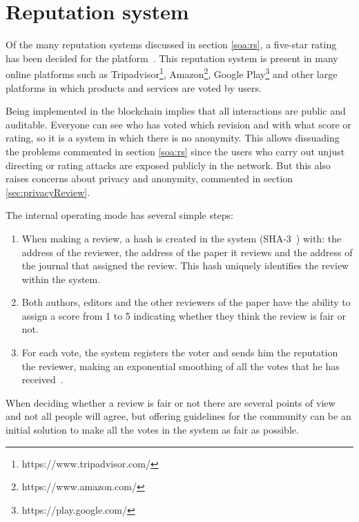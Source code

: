 \section{Reputation system}
\label{rep:system}

Of the many reputation systems discussed in section \ref{soa:rs}, a five-star
rating has been decided for the platform~\cite{kinateder2003architecture}. This
reputation system is present in many online platforms such as
Tripadvisor\footnote{https://www.tripadvisor.com/},
Amazon\footnote{https://www.amazon.com/}, Google
Play\footnote{https://play.google.com/} and other large platforms in which
products and services are voted by users.

Being implemented in the blockchain implies that all interactions are public and
auditable. Everyone can see who has voted which revision and with what score or
rating, so it is a system in which there is no anonymity. This allows dissuading
the problems commented in section \ref{soa:rs} since the users who carry out
unjust directing or rating attacks are exposed publicly in the network. But this
also raises concerns about privacy and anonymity, commented in section
\ref{sec:privacyReview}.

The internal operating mode has several simple steps:
\begin{enumerate}
\item When making a review, a hash is created in the system
  (SHA-3~\cite{aumasson2008sha}) with: the address of the reviewer, the address
  of the paper it reviews and the address of the journal that assigned the
  review. This hash uniquely identifies the review within the system.
  
\item Both authors, editors and the other reviewers of the paper have the
  ability to assign a score from 1 to 5 indicating whether they think the review
  is fair or not.
  
\item For each vote, the system registers the voter and sends him the reputation
     the reviewer, making an exponential smoothing of all the votes that he has
     received~\cite{gardner1985exponential}.
\end{enumerate}

When deciding whether a review is fair or not there are several points of
view~\cite{daniel1993guardians,cole1979fair} and not all people will agree, but
offering guidelines for the community can be an initial solution to make all the
votes in the system as fair as possible.

